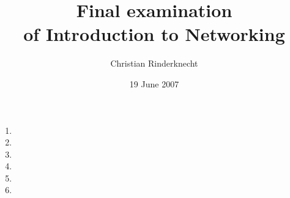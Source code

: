 \documentclass[10pt,a4paper]{article}
\title{Final examination\\ of Introduction to Networking}
\author{Christian Rinderknecht}
\date{19 June 2007}
\begin{document}
\maketitle

\thispagestyle{empty}

\begin{enumerate}

  \item
    
    

  \item
    
    

  \item
    
    

  \item
    
    

  \item
    
    

  \item
    
    

\end{enumerate}
\end{document}
